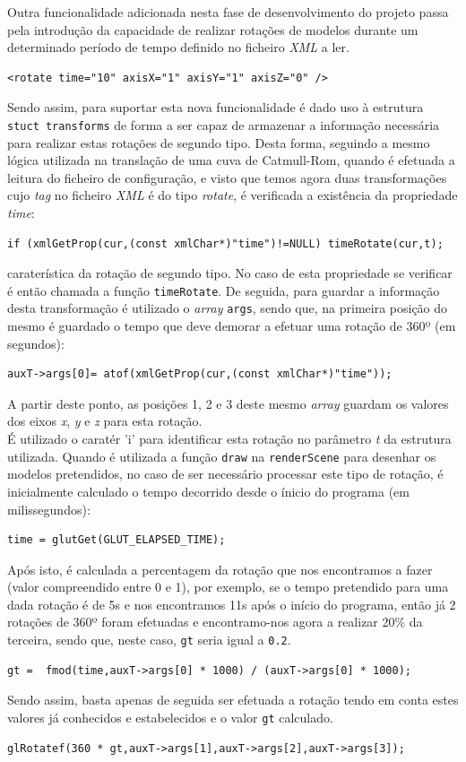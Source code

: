 \documentclass{article}
\begin{document}
Outra funcionalidade adicionada nesta fase de desenvolvimento do projeto passa pela introdução da capacidade de realizar rotações de modelos durante um determinado período de tempo definido no ficheiro \textit{XML} a ler.
\begin{verbatim}
<rotate time="10" axisX="1" axisY="1" axisZ="0" />
\end{verbatim}
Sendo assim, para suportar esta nova funcionalidade é dado uso à estrutura \texttt{stuct transforms} de forma a ser capaz de armazenar a informação necessária para realizar estas rotações de segundo tipo. Desta forma, seguindo a mesmo lógica utilizada na translação de uma cuva de Catmull-Rom, quando é efetuada a leitura do ficheiro de configuração, e visto que temos agora duas transformações cujo \textit{tag} no ficheiro \textit{XML} é do tipo \textit{rotate}, é verificada a existência da propriedade \textit{time}:
\begin{verbatim}
if (xmlGetProp(cur,(const xmlChar*)"time")!=NULL) timeRotate(cur,t);
\end{verbatim}
caraterística da rotação de segundo tipo. No caso de esta propriedade se verificar é então chamada a função \texttt{timeRotate}. De seguida, para guardar a informação desta transformação é utilizado o \textit{array} \texttt{args}, sendo que, na primeira posição do mesmo é guardado o tempo que deve demorar a efetuar uma rotação de 360º (em segundos):
\begin{verbatim}
auxT->args[0]= atof(xmlGetProp(cur,(const xmlChar*)"time"));
\end{verbatim}
A partir deste ponto, as posições 1, 2 e 3 deste mesmo \textit{array} guardam os valores dos eixos \textit{x}, \textit{y} e \textit{z} para esta rotação.\\
É utilizado o caratér 'i' para identificar esta rotação no parâmetro \textit{t} da estrutura utilizada.
\newline
Quando é utilizada a função \texttt{draw} na \texttt{renderScene} para desenhar os modelos pretendidos, no caso de ser necessário processar este tipo de rotação, é inicialmente calculado o tempo decorrido desde o ínicio do programa (em milissegundos):
\begin{verbatim}
time = glutGet(GLUT_ELAPSED_TIME);
\end{verbatim}
Após isto, é calculada a percentagem da rotação que nos encontramos a fazer (valor compreendido entre 0 e 1), por exemplo, se o tempo pretendido para uma dada rotação 
é de 5s e nos encontramos 11s após o início do programa, então já 2 rotações de 360º foram efetuadas e encontramo-nos agora a realizar 20\% da terceira, sendo que, neste caso, \texttt{gt} seria igual a \texttt{0.2}.
\begin{verbatim}
gt =  fmod(time,auxT->args[0] * 1000) / (auxT->args[0] * 1000);
\end{verbatim}
Sendo assim, basta apenas de seguida ser efetuada a rotação tendo em conta estes valores já conhecidos e estabelecidos e o valor \texttt{gt} calculado.
\begin{verbatim}
glRotatef(360 * gt,auxT->args[1],auxT->args[2],auxT->args[3]);
\end{verbatim}
\end{document}
